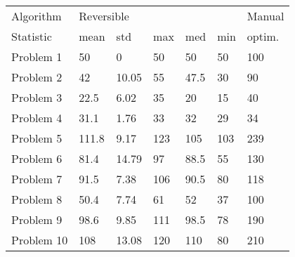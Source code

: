 \begin{tabular}{lllllll}
\toprule
Algorithm & \multicolumn{5}{l}{Reversible} & Manual \\
Statistic &       mean &    std &  max &   med &  min & optim. \\
\midrule
Problem 1  &         50 &      0 &   50 &    50 &   50 &    100 \\
Problem 2  &         42 &  10.05 &   55 &  47.5 &   30 &     90 \\
Problem 3  &       22.5 &   6.02 &   35 &    20 &   15 &     40 \\
Problem 4  &       31.1 &   1.76 &   33 &    32 &   29 &     34 \\
Problem 5  &      111.8 &   9.17 &  123 &   105 &  103 &    239 \\
Problem 6  &       81.4 &  14.79 &   97 &  88.5 &   55 &    130 \\
Problem 7  &       91.5 &   7.38 &  106 &  90.5 &   80 &    118 \\
Problem 8  &       50.4 &   7.74 &   61 &    52 &   37 &    100 \\
Problem 9  &       98.6 &   9.85 &  111 &  98.5 &   78 &    190 \\
Problem 10 &        108 &  13.08 &  120 &   110 &   80 &    210 \\
\bottomrule
\end{tabular}
